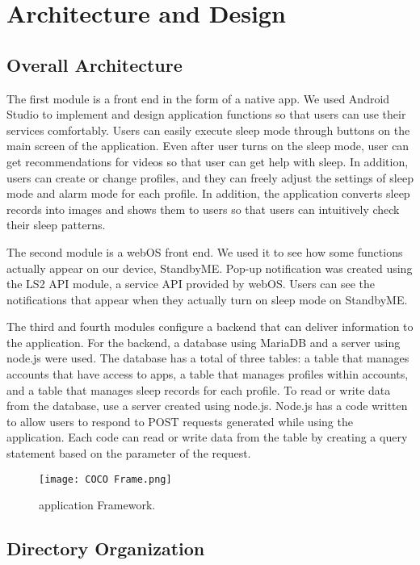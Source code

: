 \documentclass[conference]{IEEEtran}
\begin{document}
\section{Architecture and Design}

\subsection{Overall Architecture}

The first module is a front end in the form of a native app. We used Android Studio to implement and design application functions so that users can use their services comfortably. Users can easily execute sleep mode through buttons on the main screen of the application. Even after user turns on the sleep mode, user can get recommendations for videos so that user can get help with sleep. In addition, users can create or change profiles, and they can freely adjust the settings of sleep mode and alarm mode for each profile. In addition, the application converts sleep records into images and shows them to users so that users can intuitively check their sleep patterns.\break
\par The second module is a webOS front end. We used it to see how some functions actually appear on our device, StandbyME. Pop-up notification was created using the LS2 API module, a service API provided by webOS. Users can see the notifications that appear when they actually turn on sleep mode on StandbyME.\break
\par The third and fourth modules configure a backend that can deliver information to the application. For the backend, a database using MariaDB and a server using node.js were used. The database has a total of three tables: a table that manages accounts that have access to apps, a table that manages profiles within accounts, and a table that manages sleep records for each profile. To read or write data from the database, use a server created using node.js. Node.js has a code written to allow users to respond to POST requests generated while using the application. Each code can read or write data from the table by creating a query statement based on the parameter of the request.

\begin{figure}[H]
\texttt{[image: COCO Frame.png]}
\centering
\caption{application Framework.}
\end{figure}

\subsection{Directory Organization}
\end{document}
